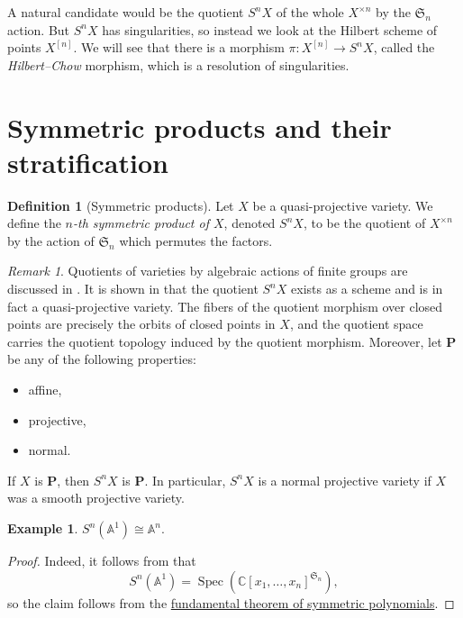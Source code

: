 \documentclass[12pt,a4paper]{amsart}
\theoremstyle{plain}
\theoremstyle{definition}
\newtheorem{defn}[thm]{Definition}
\newtheorem{exmp}[thm]{Example}
\theoremstyle{remark}
\newtheorem{rem}[thm]{Remark}
\begin{document}
A natural candidate would be the quotient $S^{n}X$ of the whole $X^{\times n}$ by the $\mathfrak{S}_{n}$ action.
But $S^{n}X$ has singularities, so instead we look at the Hilbert scheme of points $X^{[n]}$.
We will see that there is a morphism $\pi \colon X^{[n]} \to S^{n}X$, called the \textit{Hilbert--Chow} morphism, which is a resolution of singularities.

\section{Symmetric products and their stratification}

\begin{defn}[Symmetric products]
  Let $X$ be a quasi-projective variety.
  We define the \textit{$n$-th symmetric product of $X$}, denoted $S^{n}X$, to be the quotient of $X^{\times n}$ by the action of $\mathfrak{S}_{n}$ which permutes the factors.
\end{defn}

\begin{rem}
  Quotients of varieties by algebraic actions of finite groups are discussed in .
  It is shown in  that the quotient $S^{n}X$ exists as a scheme and is in fact a quasi-projective variety.
  The fibers of the quotient morphism over closed points are precisely the orbits of closed points in $X$, and the quotient space carries the quotient topology induced by the quotient morphism.
  Moreover, let $\mathbf{P}$ be any of the following properties:
  \begin{itemize}
    \item affine,
    \item projective,
    \item normal.
  \end{itemize}
  If $X$ is $\mathbf{P}$, then $S^{n}X$ is $\mathbf{P}$.
  In particular, $S^{n}X$ is a normal projective variety if $X$ was a smooth projective variety.
\end{rem}

\begin{exmp}\label{exmp:affineline}
  $S^{n}(\mathbb{A}^{1}) \cong \mathbb{A}^{n}$.
  
  \begin{proof}
    Indeed, it follows from  that
    \[ S^{n}(\mathbb{A}^{1}) = \operatorname{Spec}\left(\mathbb{C}[x_{1}, \ldots, x_{n}]^{\mathfrak{S}_{n}}\right), \]
    so the claim follows from the \href{https://en.wikipedia.org/wiki/Elementary_symmetric_polynomial#Fundamental_theorem_of_symmetric_polynomials}{fundamental theorem of symmetric polynomials}.
  \end{proof}
\end{exmp}
\end{document}
